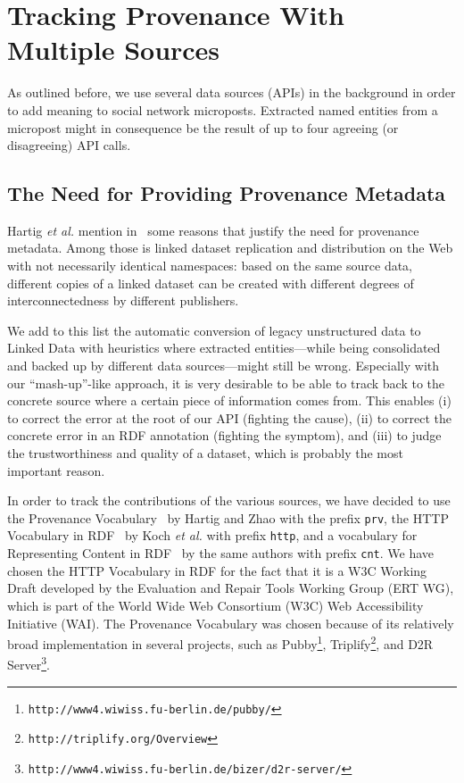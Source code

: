 \documentclass[twocolumn]{article}
\begin{document}
\section{Tracking Provenance With Multiple Sources}                    \label{sec:tracking}
As outlined before, we use several data sources (APIs) in the background in order to add meaning to social network microposts. Extracted named entities from a micropost might in consequence be the result of up to four agreeing (or disagreeing) API calls. 

\subsection{The Need for Providing Provenance Metadata}
Hartig \emph{et al.} mention in~\cite{ipaw10:olaf} some reasons that justify the need for provenance metadata. Among those is linked dataset replication and distribution on the Web with not necessarily identical namespaces: based on the same source data, different copies of a linked dataset can be created with different degrees of interconnectedness by different publishers.

We add to this list the automatic conversion of legacy unstructured data to Linked Data with heuristics where extracted entities---while being consolidated and backed up by different data sources---might still be wrong. Especially with our ``mash-up''-like approach, it is very desirable to be able to track back to the concrete source where a certain piece of information comes from. This enables (i) to correct the error at the root of our API (fighting the cause), (ii) to correct the concrete error in an RDF annotation (fighting the symptom), and (iii) to judge the trustworthiness and quality of a dataset, which is probably the most important reason.

In order to track the contributions of the various sources, we have decided to use the Provenance Vocabulary~\cite{Hartig:Provenance} by Hartig and Zhao with the prefix \texttt{prv}, the HTTP Vocabulary in RDF~\cite{HTTP:RDF} by Koch \emph{et al.} with prefix \texttt{http}, and a vocabulary for Representing Content in RDF~\cite{CNT:RDF} by the same authors with prefix \texttt{cnt}. We have chosen the HTTP Vocabulary in RDF for the fact that it is a W3C Working Draft  developed by the Evaluation and Repair Tools Working Group (ERT WG), which is part of the World Wide Web Consortium (W3C) Web Accessibility Initiative (WAI). The Provenance Vocabulary was chosen because of its relatively broad implementation in several projects, such as Pubby\footnote{\texttt{http://www4.wiwiss.fu-berlin.de/pubby/}}, Triplify\footnote{\texttt{http://triplify.org/Overview}}, and D2R Server\footnote{\texttt{http://www4.wiwiss.fu-berlin.de/bizer/d2r-server/}}.
\end{document}
